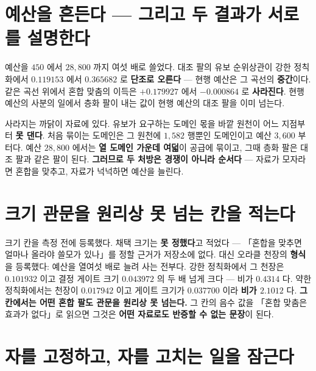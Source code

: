\section{예산을 흔든다 --- 그리고 두 결과가 서로를 설명한다}


예산을 $450$ 에서 $28{,}800$ 까지 여섯 배로 쓸었다. 대조 팔의 유보 순위상관이 강한 정칙화에서 $0.119153$ 에서 $0.365682$ 로 \textbf{단조로 오른다} --- 현행 예산은 그 곡선의 \textbf{중간}이다. 같은 곡선 위에서 혼합 맞춤의 이득은 $+0.179927$ 에서 $-0.000864$ 로 \textbf{사라진다}. 현행 예산의 사분의 일에서 층화 팔이 내는 값이 현행 예산의 대조 팔을 이미 넘는다.

사라지는 까닭이 자료에 있다. 유보가 요구하는 도메인 몫을 바깥 원천이 어느 지점부터 \textbf{못 댄다}. 처음 묶이는 도메인은 그 원천에 $1{,}582$ 행뿐인 도메인이고 예산 $3{,}600$ 부터다. 예산 $28{,}800$ 에서는 \textbf{열 도메인 가운데 여덟}이 공급에 묶이고, 그때 층화 팔은 대조 팔과 같은 팔이 된다. \textbf{그러므로 두 처방은 경쟁이 아니라 순서다} --- 자료가 모자라면 혼합을 맞추고, 자료가 넉넉하면 예산을 늘린다.

\section{크기 관문을 원리상 못 넘는 칸을 적는다}


크기 칸을 측정 전에 등록했다. 채택 크기는 \textbf{못 정했다}고 적었다 --- 「혼합을 맞추면 얼마나 올라야 쓸모가 있나」를 정할 근거가 저장소에 없다. 대신 오라클 천장의 \textbf{형식}을 등록했다: 예산을 열여섯 배로 늘려 사는 전부다. 강한 정칙화에서 그 천장은 $0.101932$ 이고 결정 게이트 크기 $0.043972$ 의 두 배 넘게 크다 --- 비가 $0.4314$ 다. 약한 정칙화에서는 천장이 $0.017942$ 이고 게이트 크기가 $0.037700$ 이라 \textbf{비가 $2.1012$} 다. \textbf{그 칸에서는 어떤 혼합 팔도 관문을 원리상 못 넘는다.} 그 칸의 음수 값을 「혼합 맞춤은 효과가 없다」로 읽으면 그것은 \textbf{어떤 자료로도 반증할 수 없는 문장}이 된다.

\section{자를 고정하고, 자를 고치는 일을 잠근다}

